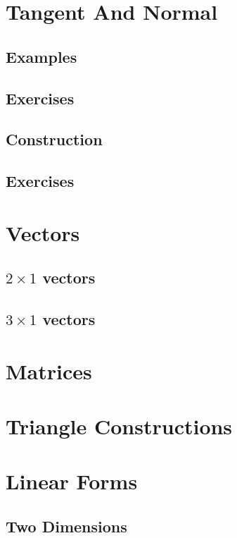 \documentclass[11pt]{book}
\begin{document}
\chapter{Tangent And Normal}
\section{Examples}

\section{Exercises}

\section{Construction}

\section{Exercises}

\fi


% 
\backmatter
\appendix
\chapter{ Vectors}
\iffalse
\section{$2\times 1$ vectors}

%
\section{$3\times 1$ vectors}

\chapter{Matrices}



\chapter{Triangle Constructions}



\chapter{Linear Forms}
\section{Two Dimensions}

\end{document}
